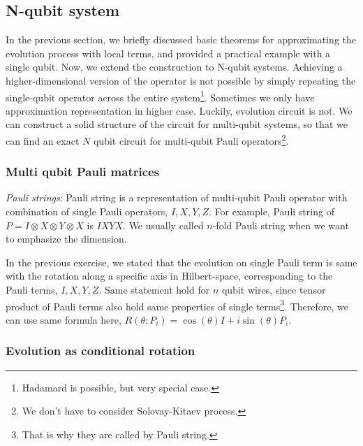 \subsection{N-qubit system}

%
%

In the previous section, we briefly discussed basic theorems for approximating the evolution 
process with local terms, and provided a practical example with a single qubit. 
Now, we extend the construction to N-qubit systems. 
Achieving a higher-dimensional version of the operator is not possible 
by simply repeating the single-qubit operator across the entire system\footnote{Hadamard is possible, but very special case.}. 
Sometimes we only have approximation representation in higher case.
Luckily, evolution circuit is not. 
We can construct a solid structure of the circuit for multi-qubit systems,
so that we can find an exact $N$ qubit circuit 
for multi-qubit Pauli operators\footnote{We don't have to consider Solovay-Kitaev process.}.

\subsubsection{Multi qubit Pauli matrices}

\textit{Pauli strings}: Pauli string is a representation of multi-qubit Pauli operator with combination of single Pauli operators, $I, X, Y, Z$.
For example, Pauli string of $P = I \otimes X \otimes Y \otimes X$ is $IXYX$.
We usually called $n$-fold Pauli string when we want to emphasize the dimension.

In the previous exercise, we stated that 
the evolution on single Pauli term is same with the rotation 
along a specific axis in Hilbert-space, corresponding to the Pauli terms, $I, X, Y, Z$.
Same statement hold for $n$ qubit wires, since tensor product of Pauli terms also hold
same properties of single terms\footnote{That is why they are called by Pauli string.}.
Therefore, we can use same formula here, $R(\theta; P_i) = \cos(\theta) I+ i \sin(\theta)P_i$.


\subsubsection{Evolution as conditional rotation}

